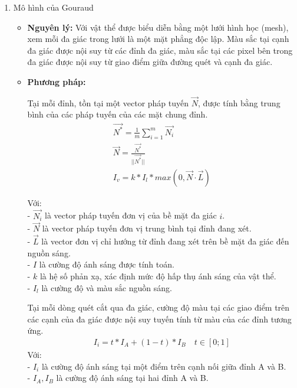 \begin{enumerate}
\begin{itemize}
		\item \textbf{Đóng góp:} Hiệu suất tính toán của kết xuất phẳng rất cao. Vì chỉ có một phép tính chiếu sáng cho mỗi đa giác, đây là phương pháp nhanh nhất có thể, cho phép các hệ thống phần cứng sơ khai có thể kết xuất các cảnh 3D rắn trong thời gian thực.
		 
		\item \textbf{Hạn chế:} Vì mỗi đa giác có một màu riêng biệt, các bề mặt cong được xấp xỉ bằng lưới đa giác sẽ có vẻ ngoài "gãy khúc" hoặc "khối cạnh" (faceted).
	\end{itemize}
	
	\item Mô hình của Gouraud
	\begin{itemize}
		\item \textbf{Nguyên lý:} Với vật thể được biểu diễn bằng một lưới hình học (mesh), xem mỗi đa giác trong lưới là một mặt phẳng độc lập. Màu sắc tại cạnh đa giác được nội suy từ các đỉnh đa giác, màu sắc tại các pixel bên trong đa giác được nội suy từ giao điểm giữa đường quét và cạnh đa giác\cite{gouraud2}.
		
		\item \textbf{Phương pháp:}
		
		Tại mỗi đỉnh, tồn tại một vector pháp tuyến $\vec{N}$, được tính bằng trung bình của các pháp tuyến của các mặt chung đỉnh.
		\begin{gather*}
			\vec{N^*} = \frac{1}{m} \sum_{i=1}^{m} \vec{N_i}\\
			\vec{N} = \frac{\vec{N^*}}{||\vec{N^*}||}\\
			I_v = k * I_l * max(0, \vec{N} \cdot \vec{L})
		\end{gather*}
		
		Với:\\
		- $\vec{N_i}$ là vector pháp tuyến đơn vị của bề mặt đa giác $i$.\\
		- $\vec{N}$ là vector pháp tuyến đơn vị trung bình tại đỉnh đang xét.\\
		- $\vec{L}$ là vector đơn vị chỉ hướng từ đỉnh đang xét trên bề mặt đa giác đến nguồn sáng.\\
		- $I$ là cường độ ánh sáng được tính toán.\\
		- $k$ là hệ số phản xạ, xác định mức độ hấp thụ ánh sáng của vật thể.\\
		- $I_l$ là cường độ và màu sắc nguồn sáng.

		Tại mỗi dòng quét cắt qua đa giác, cường độ màu tại các giao điểm trên các cạnh của đa giác được nội suy tuyến tính từ màu của các đỉnh tương ứng.\\
		\begin{gather*}
			I_i = t * I_A + (1 - t) * I_B \quad t \in [0; 1]
		\end{gather*}
		Với:\\
		- $I_i$ là cường độ ánh sáng tại một điểm trên cạnh nối giữa đỉnh A và B.\\
		- $I_A, I_B$ là cường độ ánh sáng tại hai đỉnh A và B.
		

\end{itemize}
\end{enumerate}
